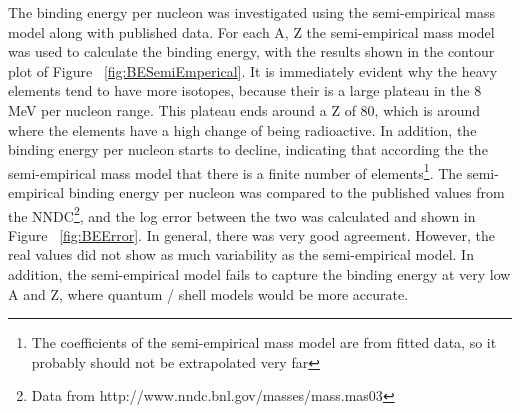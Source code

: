 \documentclass[11pt]{article}
\begin{document}
The binding energy per nucleon was investigated using the semi-empirical mass model along with published data.
For each A, Z the semi-empirical mass model was used to calculate the binding energy, with the results shown in the contour plot of Figure ~\ref{fig:BESemiEmperical}.
It is immediately evident why the heavy elements tend to have more isotopes, because their is a large plateau in the 8 MeV per nucleon range.
This plateau ends around a Z of 80, which is around where the elements have a high change of being radioactive.
In addition, the binding energy per nucleon starts to decline, indicating that according the the semi-empirical mass model that there is a finite number of elements\footnote{The coefficients of the semi-empirical mass model are from fitted data, so it probably should not be extrapolated very far}.
The semi-empirical binding energy per nucleon was compared to the published values from the NNDC\footnote{Data from http://www.nndc.bnl.gov/masses/mass.mas03}, and the log error between the two was calculated and shown in Figure ~\ref{fig:BEError}.
In general, there was very good agreement.  However, the real values did not show as much variability as the semi-empirical model. In addition, the semi-empirical model fails to capture the binding energy at very low A and Z, where quantum / shell models would be more accurate.
\end{document}

